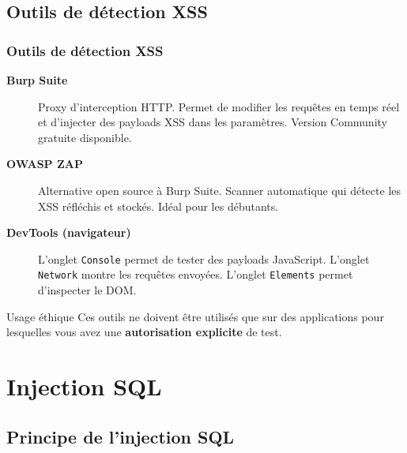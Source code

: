 \documentclass{beamer}
\def\emptyline{\vspace{10pt}}
\begin{document}
\subsection{Outils de détection XSS}

\begin{frame}
\frametitle{Outils de détection XSS}

\begin{description}
\item[\textbf{Burp Suite}] Proxy d'interception HTTP. Permet de modifier les requêtes en temps réel et d'injecter des payloads XSS dans les paramètres. Version Community gratuite disponible.

\item[\textbf{OWASP ZAP}] Alternative open source à Burp Suite. Scanner automatique qui détecte les XSS réfléchis et stockés. Idéal pour les débutants.

\item[\textbf{DevTools (navigateur)}] L'onglet \texttt{Console} permet de tester des payloads JavaScript. L'onglet \texttt{Network} montre les requêtes envoyées. L'onglet \texttt{Elements} permet d'inspecter le DOM.
\end{description}

\emptyline
\begin{alertblock}{Usage éthique}
Ces outils ne doivent être utilisés que sur des applications pour lesquelles vous avez une \textbf{autorisation explicite} de test.
\end{alertblock}
\end{frame}


\section{Injection SQL}


\subsection{Principe de l'injection SQL}
\end{document}
